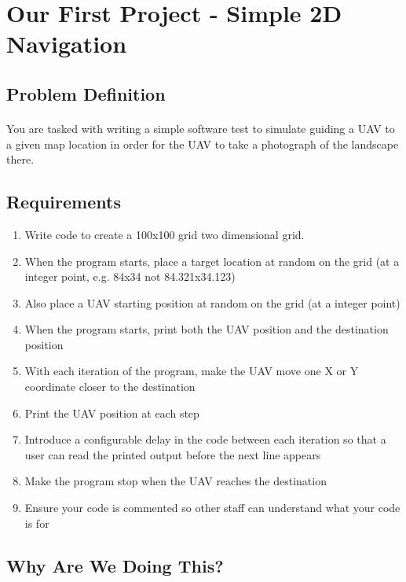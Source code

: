 \documentclass[11pt]{book}
\begin{document}
\clearpage



\section{Our First Project - Simple 2D Navigation}

\subsection{Problem Definition}

\paragraph{} You are tasked with writing a simple software test to simulate guiding a UAV to a given map location in order for the UAV to take a photograph of the landscape there. 

\subsection{Requirements}

\begin{enumerate}
\item Write code to create a 100x100 grid two dimensional grid.
\item When the program starts, place a target location at random on the grid (at a integer point, e.g. 84x34 not 84.321x34.123)
\item Also place a UAV starting position at random on the grid (at a integer point)
\item When the program starts, print both the UAV position and the destination position
\item With each iteration of the program, make the UAV move one X or Y coordinate closer to the destination
\item Print the UAV position at each step
\item Introduce a configurable delay in the code between each iteration so that a user can read the printed output before the next line appears
\item Make the program stop when the UAV reaches the destination
\item Ensure your code is commented so other staff can understand what your code is for
\end{enumerate}

\subsection{Why Are We Doing This?}
\end{document}
